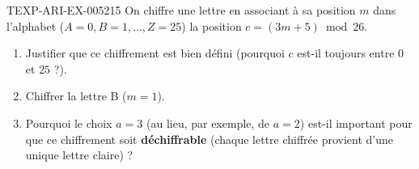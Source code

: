 \begin{exercice}{TEXP-ARI-EX-005}{2}{15}
On chiffre une lettre en associant à sa position $m$ dans l'alphabet ($A=0,B=1,\dots,Z=25$) la position $c=(3m+5)\bmod26$.
\begin{enumerate}
  \item Justifier que ce chiffrement est bien défini (pourquoi $c$ est-il toujours entre $0$ et $25$ ?).
  \item Chiffrer la lettre \og B \fg{} ($m=1$).
  \item Pourquoi le choix $a=3$ (au lieu, par exemple, de $a=2$) est-il important pour que ce chiffrement soit \textbf{déchiffrable} (chaque lettre chiffrée provient d'une unique lettre claire) ?
\end{enumerate}
\end{exercice}

